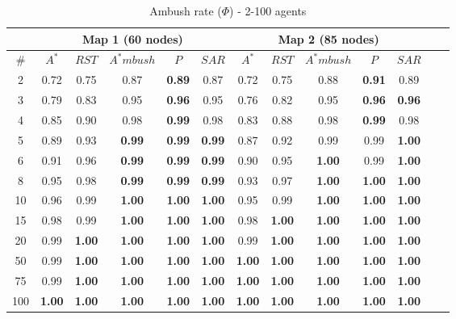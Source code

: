 \begin{table}[h]
\caption{Ambush rate ($\Phi$) - 2-100 agents}
\begin{center}

\begin{tabular}{|c|c|c|c|c|c||c|c|c|c|c|c|c|}
\hline
 & 
\multicolumn{5}{|c||}{\textbf{Map 1 (60 nodes)}} &
\multicolumn{5}{|c|}{\textbf{Map 2 (85 nodes)}}\\
\hline
\# & $A^*$ & $RST$ & $A^*mbush$ & $P$ & $SAR$ &
	 $A^*$ & $RST$ & $A^*mbush$ & $P$ & $SAR$\\
\hline
 2 & 0.72 & 0.75 & 0.87 & \textbf{0.89} & 0.87 &
	 0.72 & 0.75 & 0.88 & \textbf{0.91} & 0.89\\
 3 & 0.79 & 0.83 & 0.95 & \textbf{0.96} & 0.95 &
	 0.76 & 0.82 & 0.95 & \textbf{0.96} & \textbf{0.96}\\
 4 & 0.85 & 0.90 & 0.98 & \textbf{0.99} & 0.98 &
	 0.83 & 0.88 & 0.98 & \textbf{0.99} & 0.98\\
 5 & 0.89 & 0.93 & \textbf{0.99} & \textbf{0.99} & \textbf{0.99} &
	 0.87 & 0.92 & 0.99 & 0.99 & \textbf{1.00}\\
 6 & 0.91 & 0.96 & \textbf{0.99} & \textbf{0.99} & \textbf{0.99} &
	 0.90 & 0.95 & \textbf{1.00} & 0.99 & \textbf{1.00}\\
 8 & 0.95 & 0.98 & \textbf{0.99} & \textbf{0.99} & \textbf{0.99} &
	0.93 & 0.97 & \textbf{1.00} & \textbf{1.00} & \textbf{1.00}\\
10 & 0.96 & 0.99 & \textbf{1.00} & \textbf{1.00} & \textbf{1.00} &
	 0.95 & 0.99 & \textbf{1.00} & \textbf{1.00} & \textbf{1.00}\\
15 & 0.98 & 0.99 & \textbf{1.00} & \textbf{1.00} & \textbf{1.00} &
	 0.98 & \textbf{1.00} & \textbf{1.00} & \textbf{1.00} & \textbf{1.00}\\
20 & 0.99 & \textbf{1.00} & \textbf{1.00} & \textbf{1.00} & \textbf{1.00} &
     0.99 & \textbf{1.00} & \textbf{1.00} & \textbf{1.00} & \textbf{1.00}\\
50 & 0.99 & \textbf{1.00} & \textbf{1.00} & \textbf{1.00} & \textbf{1.00} &
	\textbf{1.00} & \textbf{1.00} & \textbf{1.00} & \textbf{1.00} & 
	\textbf{1.00}\\
75 & 0.99 & \textbf{1.00} & \textbf{1.00} & \textbf{1.00} & \textbf{1.00} &
	\textbf{1.00} & \textbf{1.00} & \textbf{1.00} & \textbf{1.00} &
	\textbf{1.00}\\
100 & \textbf{1.00} & \textbf{1.00} & \textbf{1.00} & \textbf{1.00} & 
	\textbf{1.00} & 
	\textbf{1.00} & \textbf{1.00} & \textbf{1.00} & \textbf{1.00} & \textbf{1.00}\\
\hline
\end{tabular}

\label{ambushrate}
\end{center}
\end{table}

